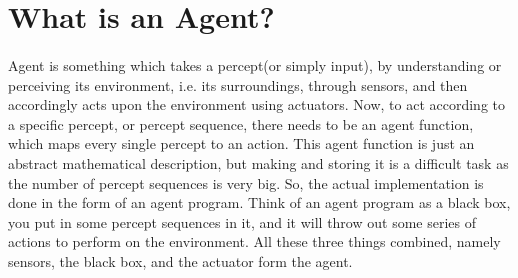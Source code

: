 \documentclass{article}
\begin{document}

















\section*{What is an Agent?} 
\paragraph{}
  Agent is something which takes a percept(or simply input), by understanding or perceiving its environment, i.e. its surroundings, through sensors, and then accordingly acts upon the environment using actuators.
  Now, to act according to a specific percept, or percept sequence, there needs to be an agent function, which maps every single percept to an action. 
  This agent function is just an abstract mathematical description, but making and storing it is a difficult task as the number of percept sequences is very big. 
  So, the actual implementation is done in the form of an agent program. Think of an agent program as a black box, you put in some percept sequences in it, and it will throw out some series of actions to perform on the environment.
  All these three things combined, namely sensors, the black box, and the actuator form the agent.
\end{document}
